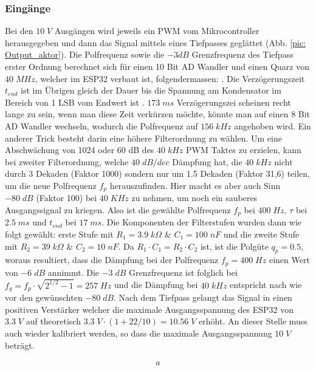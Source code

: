 \subsubsection{Eingänge}
Bei den $10\;V$ Ausgängen wird jeweils ein PWM vom Mikrocontroller herausgegeben und dann das Signal mittels eines Tiefpasses geglättet (Abb. \ref{pic: Output_aktor}). Die Polfrequenz sowie die $-3dB$ Grenzfrequenz des Tiefpass erster Ordnung berechnet sich für einen 10 Bit AD Wandler und einen Quarz von $40\;MHz$, welcher im ESP32 verbaut ist, folgendermassen: . Die Verzögerungszeit $t_{end}$ ist im Übrigen gleich der Dauer bis die Spannung am Kondensator im Bereich von 1 LSB vom Endwert ist \cite{ronald_locher_2017}. $173\;ms$ Verzögerungszei scheinen recht lange zu sein, wenn man diese Zeit verkürzen möchte, könnte man auf einen 8 Bit AD Wandler wechseln, wodurch die Polfrequenz auf $156\;kHz$ angehoben wird. Ein anderer Trick besteht darin eine höhere Filterordnung zu wählen. Um eine Abschwächung von 1024 oder 60 dB des $40\;kHz$ PWM Taktes zu erzielen, kann bei zweiter Filterordnung, welche $40\;dB/dec$ Dämpfung hat, die $40\;kHz$ nicht durch 3 Dekaden (Faktor 1000) sondern nur um 1.5 Dekaden (Faktor 31,6) teilen, um die neue Polfrequenz $f_p$ herauszufinden. Hier macht es aber auch Sinn $-80\;dB$ (Faktor 100) bei $40\;KHz$ zu nehmen, um noch ein sauberes Ausgangssignal zu kriegen. Also ist die gewählte Polfrequenz $f_p$ bei $400\;Hz$, $\tau$ bei $2.5\;ms$ und $ t_{end}$ bei $17\;ms$. Die Komponenten der Filterstufen wurden dann wie folgt gewählt: erste Stufe mit $R_1 = 3.9\;k \Omega $ \& $C_1 = 100\;nF$ und die zweite Stufe mit $R_2 = 39\;k \Omega $ \& $C_2 = 10\;nF$. Da $R_1 \cdot C_1 = R_2 \cdot C_2$ ist, ist die Polgüte $q_p = 0.5$, woraus resultiert, dass die Dämpfung bei der Polfrequenz $f_p = 400\;Hz$ einen Wert von $-6\;dB$ annimmt. Die $-3\;dB$ Grenzfrequenz ist folglich bei $f_g = f_p \cdot \sqrt{2^{1/2}-1} = 257\;Hz$ \cite{miller_rc-glied_nodate} und die Dämpfung bei $40\;kHz$ entspricht nach wie vor den gewünschten $-80\;dB$. Nach dem Tiefpass gelangt das Signal in einen positiven Verstärker welcher die maximale Ausgangsspannung des ESP32 von $3.3\;V$ auf theoretisch $ 3.3\;V \cdot (1+ 22/10) = 10.56\;V$ erhöht. An dieser Stelle muss auch wieder kalibriert werden, so dass die maximale Ausgangsspannung $10\;V$ beträgt.

\begin{align}
a
\end{align}


